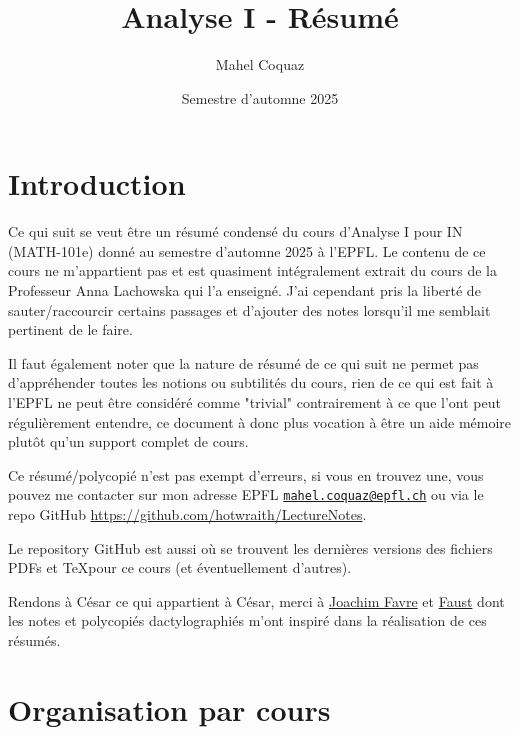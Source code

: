 \documentclass[10pt,a4paper]{book}
\title{Analyse I \vspace{0.2cm} - Résumé}
\author{Mahel Coquaz}
\date{Semestre d'automne 2025}
\begin{document}
\maketitle
\tableofcontents
\newpage
\listoflectures
\newpage

\section*{Introduction}

Ce qui suit se veut être un résumé condensé du cours d'Analyse I pour IN (MATH-101e) donné au semestre d'automne 2025 à l'EPFL. Le contenu de ce cours ne m'appartient pas et est quasiment intégralement extrait du cours de la Professeur Anna Lachowska qui l'a enseigné. J'ai cependant pris la liberté de sauter/raccourcir certains passages et d'ajouter des notes lorsqu'il me semblait pertinent de le faire. \par
Il faut également noter que la nature de résumé de ce qui suit ne permet pas d'appréhender toutes les notions ou subtilités du cours, rien de ce qui est fait à l'EPFL ne peut être considéré comme "trivial" contrairement à ce que l'ont peut régulièrement entendre, ce document à donc plus vocation à être un aide mémoire plutôt qu'un support complet de cours.  \par
Ce résumé/polycopié n'est pas exempt d'erreurs, si vous en trouvez une, vous pouvez me contacter sur mon adresse EPFL \texttt{\href{mailto:mahel.coquaz@epfl.ch}{mahel.coquaz@epfl.ch}} ou via le repo GitHub \url{https://github.com/hotwraith/LectureNotes}. \par
Le repository GitHub est aussi où se trouvent les dernières versions des fichiers PDFs et \TeX pour ce cours (et éventuellement d'autres). 
\linebreak
\par 
Rendons à César ce qui appartient à César, merci à \href{https://github.com/JoachimFavre}{Joachim Favre} et \href{https://github.com/FocusedFaust}{Faust} dont les notes et polycopiés dactylographiés m'ont inspiré dans la réalisation de ces résumés. %

\newpage

\section*{Organisation par cours}
\end{document}
